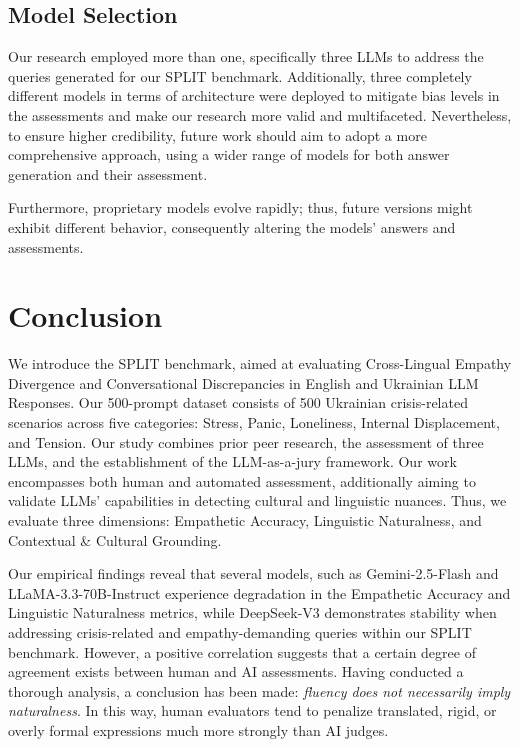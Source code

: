 \documentclass[10pt, twocolumn]{article}
\begin{document}
\subsection{Model Selection}

Our research employed more than one, specifically three LLMs to address the queries generated for our SPLIT benchmark. Additionally, three completely different models in terms of architecture were deployed to mitigate bias levels in the assessments and make our research more valid and multifaceted. Nevertheless, to ensure higher credibility, future work should aim to adopt a more comprehensive approach, using a wider range of models for both answer generation and their assessment.

Furthermore, proprietary models evolve rapidly; thus, future versions might exhibit different behavior, consequently altering the models' answers and assessments.

\section{Conclusion}
We introduce the SPLIT benchmark, aimed at evaluating Cross-Lingual Empathy Divergence and Conversational Discrepancies in English and Ukrainian LLM Responses. Our 500-prompt dataset consists of 500 Ukrainian crisis-related scenarios across five categories: Stress, Panic, Loneliness, Internal Displacement, and Tension. Our study combines prior peer research, the assessment of three LLMs, and the establishment of the LLM-as-a-jury framework. Our work encompasses both human and automated assessment, additionally aiming to validate LLMs' capabilities in detecting cultural and linguistic nuances. Thus, we evaluate three dimensions: Empathetic Accuracy, Linguistic Naturalness, and Contextual \& Cultural Grounding. 

Our empirical findings reveal that several  models, such as Gemini-2.5-Flash and LLaMA-3.3-70B-Instruct experience degradation in the Empathetic Accuracy and Linguistic Naturalness metrics, while DeepSeek-V3 demonstrates stability when addressing crisis-related and empathy-demanding queries within our SPLIT benchmark. However, a positive correlation suggests that a certain degree of agreement exists between human and AI assessments. Having conducted a thorough analysis, a conclusion has been made: \textit{fluency does not necessarily imply naturalness}. In this way, human evaluators tend to penalize translated, rigid, or overly formal expressions much more strongly than AI judges. 
\end{document}
